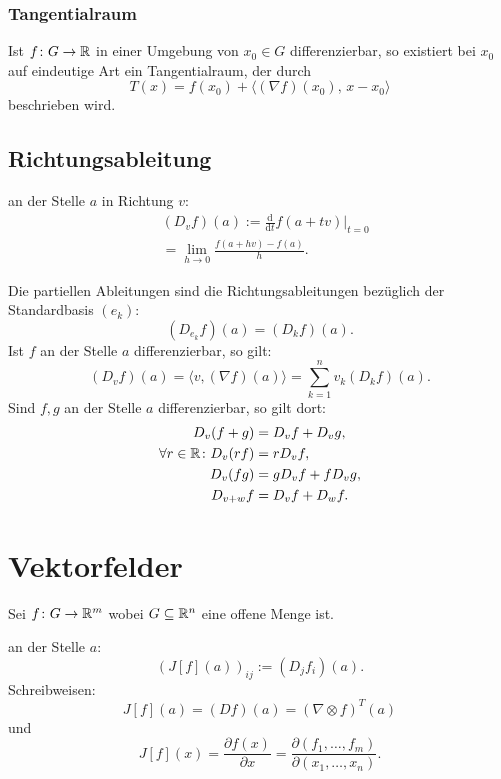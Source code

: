 \subsubsection{Tangentialraum}
Ist $f\colon G\to\mathbb R$ in einer Umgebung von $x_0\in G$
differenzierbar, so existiert bei $x_0$ auf eindeutige Art
ein Tangentialraum, der durch
\begin{equation}
T(x) = f(x_0)+\langle(\nabla f)(x_0),\,x-x_0\rangle
\end{equation}
beschrieben wird.

\subsection{Richtungsableitung}
\begin{Definition}  an der Stelle $a$
in Richtung $v$:
\begin{equation}
\begin{split}
& (D_v f)(a) := \frac{\mathrm d}{\mathrm dt} f(a+tv)\Big|_{t=0}\\
& = \lim_{h\to 0} \frac{f(a+hv)-f(a)}{h}.
\end{split}
\end{equation}
\end{Definition}
\noindent
Die partiellen Ableitungen sind die Richtungsableitungen
bezüglich der Standardbasis $(e_k)$:
\begin{equation}
(D_{\displaystyle e_k}f)(a) = (D_k f)(a).
\end{equation}
Ist $f$ an der Stelle $a$ differenzierbar, so gilt:
\begin{equation}
(D_v f)(a) = \langle v,(\nabla f)(a)\rangle
= \sum_{k=1}^n v_k (D_k f)(a).
\end{equation}
Sind $f,g$ an der Stelle $a$ differenzierbar, so gilt dort:
\begin{align}
D_v (f+g) &= D_v f+D_v g,\\
\forall r\in\mathbb R\colon D_v (rf) &= rD_v f,\\
D_v (fg) &= gD_v f+fD_v g,\\
D_{v+w} f &= D_v f+D_w f.
\end{align}

\section{Vektorfelder}
Sei $f\colon G\to\mathbb R^m$ wobei $G\subseteq\mathbb R^n$ eine offene Menge ist.
\begin{Definition} 
an der Stelle $a$:
\begin{equation}
(J[f](a))_{ij} := (D_j f_i)(a).
\end{equation}
Schreibweisen:
\begin{equation}
J[f](a) = (Df)(a) = (\nabla\otimes f)^T(a)
\end{equation}
und
\begin{equation}
J[f](x) = \frac{\partial f(x)}{\partial x}
= \frac{\partial(f_1,\ldots,f_m)}{\partial(x_1,\ldots,x_n)}.
\end{equation}
\end{Definition}

